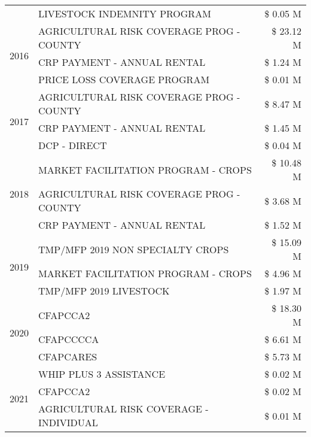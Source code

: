 \begin{tabular}{llr}
 & LIVESTOCK INDEMNITY PROGRAM & \$ 0.05 M \\
\cline{1-3}
\multirow[t]{3}{*}{2016} & AGRICULTURAL RISK COVERAGE PROG - COUNTY      & \$ 23.12 M \\
 & CRP PAYMENT - ANNUAL RENTAL                   & \$ 1.24 M \\
 & PRICE LOSS COVERAGE PROGRAM                   & \$ 0.01 M \\
\cline{1-3}
\multirow[t]{3}{*}{2017} & AGRICULTURAL RISK COVERAGE PROG - COUNTY & \$ 8.47 M \\
 & CRP PAYMENT - ANNUAL RENTAL & \$ 1.45 M \\
 & DCP - DIRECT & \$ 0.04 M \\
\cline{1-3}
\multirow[t]{3}{*}{2018} & MARKET FACILITATION PROGRAM - CROPS & \$ 10.48 M \\
 & AGRICULTURAL RISK COVERAGE PROG - COUNTY & \$ 3.68 M \\
 & CRP PAYMENT - ANNUAL RENTAL & \$ 1.52 M \\
\cline{1-3}
\multirow[t]{3}{*}{2019} & TMP/MFP 2019 NON SPECIALTY CROPS & \$ 15.09 M \\
 & MARKET FACILITATION PROGRAM - CROPS & \$ 4.96 M \\
 & TMP/MFP 2019 LIVESTOCK & \$ 1.97 M \\
\cline{1-3}
\multirow[t]{3}{*}{2020} & CFAPCCA2 & \$ 18.30 M \\
 & CFAPCCCCA & \$ 6.61 M \\
 & CFAPCARES & \$ 5.73 M \\
\cline{1-3}
\multirow[t]{3}{*}{2021} & WHIP PLUS 3 ASSISTANCE & \$ 0.02 M \\
 & CFAPCCA2 & \$ 0.02 M \\
 & AGRICULTURAL RISK COVERAGE - INDIVIDUAL & \$ 0.01 M \\
\cline{1-3}
\bottomrule
\end{tabular}
